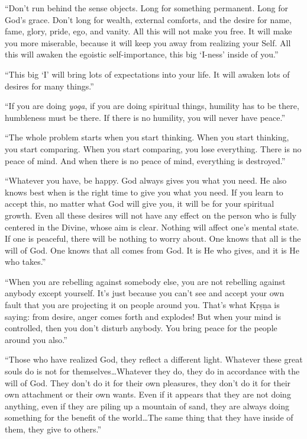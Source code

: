 \enquote{Don’t run behind the sense objects. Long for something permanent. Long for God’s grace. Don’t long for wealth, external comforts, and the desire for name, fame, glory, pride, ego, and vanity. All this will not make you free. It will make you more miserable, because it will keep you away from realizing your Self. All this will awaken the egoistic self-importance, this big \enquote{I-ness} inside of you.}

\enquote{This big \enquote{I} will bring lots of expectations into your life. It will awaken lots of desires for many things.}

\enquote{If you are doing \textit{yoga}, if you are doing spiritual things, humility has to be there, humbleness must be there. If there is no humility, you will never have peace.}

\enquote{The whole problem starts when you start thinking. When you start thinking, you start comparing. When you start comparing, you lose everything. There is no peace of mind. And when there is no peace of mind, everything is destroyed.}

\enquote{Whatever you have, be happy. God always gives you what you need. He also knows best when is the right time to give you what you need. If you learn to accept this, no matter what God will give you, it will be for your spiritual growth. Even all these desires will not have any effect on the person who is fully centered in the Divine, whose aim is clear. Nothing will affect one’s mental state. If one is peaceful, there will be nothing to worry about. One knows that all is the will of God. One knows that all comes from God. It is He who gives, and it is He who takes.}

\enquote{When you are rebelling against somebody else, you are not rebelling against anybody except yourself. It’s just because you can’t see and accept your own fault that you are projecting it on people around you. That’s what Kṛṣṇa is saying: from desire, anger comes forth and explodes! But when your mind is controlled, then you don’t disturb anybody. You bring peace for the people around you also.}

\enquote{Those who have realized God, they reflect a different light. Whatever these great souls do is not for themselves\ldots Whatever they do, they do in accordance with the will of God. They don’t do it for their own pleasures, they don’t do it for their own attachment or their own wants. Even if it appears that they are not doing anything, even if they are piling up a mountain of sand, they are always doing something for the benefit of the world\ldots The same thing that they have inside of them, they give to others.}

